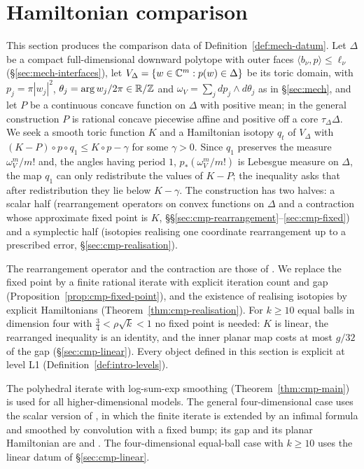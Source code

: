 \section{Hamiltonian comparison}\label{sec:cmp}

This section produces the comparison data of Definition~\ref{def:mech-datum}. Let $\Delta$ be a compact
full-dimensional downward polytope with outer faces $\langle b_\nu,p\rangle\le\ell_\nu$ (\S\ref{sec:mech-interfaces}),
let $V_\Delta=\{w\in\mathbb{C}^m:p(w)\in\Delta\}$ be its toric domain, with $p_j=\pi|w_j|^2$, $\theta_j=\arg w_j/2\pi\in\mathbb{R}/\mathbb{Z}$
and $\omega_V=\sum_jdp_j\wedge d\theta_j$ as in \S\ref{sec:mech}, and let $P$ be a continuous concave function on $\Delta$
with positive mean; in the general construction $P$ is rational concave piecewise affine and positive off a core
$\tau_\Delta\Delta$. We seek a smooth toric function $K$ and a Hamiltonian isotopy $q_t$ of $V_\Delta$ with
$(K-P)\circ p\circ q_1\le K\circ p-\gamma$ for some $\gamma>0$. Since $q_1$ preserves the measure $\omega_V^m/m!$ and,
the angles having period $1$, $p_*(\omega_V^m/m!)$ is Lebesgue measure on $\Delta$, the map $q_1$ can only redistribute
the values of $K-P$; the inequality asks that after redistribution they lie below $K-\gamma$. The construction has
two halves: a scalar half (rearrangement operators on convex functions on $\Delta$ and a contraction whose
approximate fixed point is $K$, \S\S\ref{sec:cmp-rearrangement}--\ref{sec:cmp-fixed}) and a symplectic half
(isotopies realising one coordinate rearrangement up to a prescribed error, \S\ref{sec:cmp-realisation}).

The rearrangement operator and the contraction are those of \cite[\S2]{OpenAI2026}. We replace the fixed point by a
finite rational iterate with explicit iteration count and gap (Proposition~\ref{prop:cmp-fixed-point}), and the
existence of realising isotopies by explicit Hamiltonians (Theorem~\ref{thm:cmp-realisation}). For $k\ge10$ equal
balls in dimension four with $\frac34<\rho\sqrt k<1$ no fixed point is needed: $K$ is linear, the rearranged inequality
is an identity, and the inner planar map costs at most $g/32$ of the gap (\S\ref{sec:cmp-linear}). Every object defined in this section is explicit at level L1
(Definition~\ref{def:intro-levels}).

The polyhedral iterate with log-sum-exp smoothing (Theorem~\ref{thm:cmp-main}) is used for all
higher-dimensional models. The general four-dimensional case uses the scalar version of , in
which the finite iterate is extended by an infimal formula and smoothed by convolution with a fixed bump; its gap
and its planar Hamiltonian are  and
. The four-dimensional equal-ball case with $k\ge10$ uses the linear
datum of \S\ref{sec:cmp-linear}.


